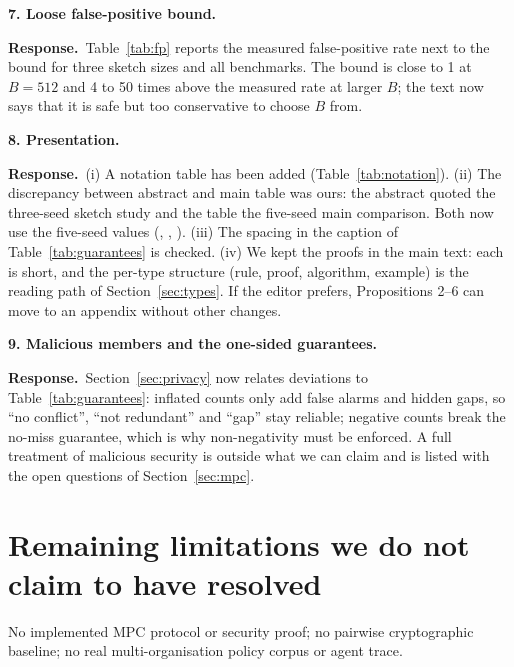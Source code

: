 \documentclass[11pt,a4paper]{article}
\newcommand{\concern}[2]{\medskip\noindent\textbf{#1}\quad\emph{#2}\par\smallskip}
\newcommand{\resp}{\noindent\textcolor{blue!55!black}{\textbf{Response.}}\ }
\begin{document}
\concern{7. Loose false-positive bound.}{}
\resp Table~\ref{tab:fp} reports the measured false-positive rate next to the bound for three sketch sizes and all benchmarks. The bound is close to 1 at $B=512$ and 4 to 50 times above the measured rate at larger $B$; the text now says that it is safe but too conservative to choose $B$ from.

\concern{8. Presentation.}{}
\resp (i) A notation table has been added (Table~\ref{tab:notation}). (ii) The discrepancy between abstract and main table was ours: the abstract quoted the three-seed sketch study and the table the five-seed main comparison. Both now use the five-seed values (\mainagenticRbig, \mainxustollerRbig, \mainamazonRbig). (iii) The spacing in the caption of Table~\ref{tab:guarantees} is checked. (iv) We kept the proofs in the main text: each is short, and the per-type structure (rule, proof, algorithm, example) is the reading path of Section~\ref{sec:types}. If the editor prefers, Propositions 2--6 can move to an appendix without other changes.

\concern{9. Malicious members and the one-sided guarantees.}{}
\resp Section~\ref{sec:privacy} now relates deviations to Table~\ref{tab:guarantees}: inflated counts only add false alarms and hidden gaps, so ``no conflict'', ``not redundant'' and ``gap'' stay reliable; negative counts break the no-miss guarantee, which is why non-negativity must be enforced. A full treatment of malicious security is outside what we can claim and is listed with the open questions of Section~\ref{sec:mpc}.

\section*{Remaining limitations we do not claim to have resolved}
No implemented MPC protocol or security proof; no pairwise cryptographic baseline; no real multi-organisation policy corpus or agent trace.
\end{document}
